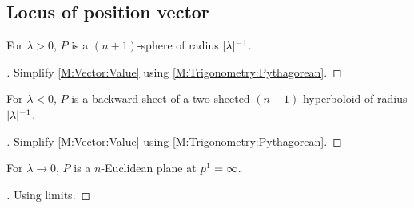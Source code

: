 \documentclass[../main.tex]{subfiles}
\begin{document}
\subsection{Locus of position vector}
\begin{lemma}\label{SphericalLocus}
For \(\lambda>0\), \(P\) is a \(\left(n+1\right)\)-sphere of radius \(\lvert\lambda\rvert^{-1}\).
\end{lemma}
\begin{proof}[]
Simplify \cref{M:Vector:Value} using \cref{M:Trigonometry:Pythagorean}.
\end{proof}
\begin{lemma}\label{HyperbolicLocus}
For \(\lambda<0\), \(P\) is a backward sheet of a two-sheeted \(\left(n+1\right)\)-hyperboloid of radius \(\lvert\lambda\rvert^{-1}\).
\end{lemma}
\begin{proof}[]
Simplify \cref{M:Vector:Value} using \cref{M:Trigonometry:Pythagorean}.
\end{proof}
\begin{lemma}\label{EuclideanLocus}
For \(\lambda\to0\), \(P\) is a \(n\)-Euclidean plane at \(\tensor{p}{^1}=\infty\).
\end{lemma}
\begin{proof}[]
Using limits.
\end{proof}
\end{document}
